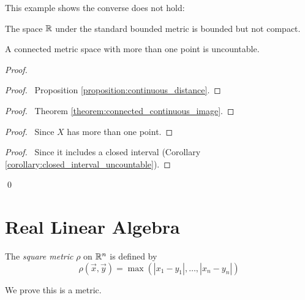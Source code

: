 This example shows the converse does not hold:

\begin{example}
    The space $\mathbb{R}$ under the standard bounded metric is bounded but not compact.
\end{example}

\begin{proposition}
    A connected metric space with more than one point is uncountable.
\end{proposition}

\begin{proof}
    \pf
    \begin{proof}
        \pf\ Proposition \ref{proposition:continuous_distance}.
    \end{proof}
    \begin{proof}
        \pf\ Theorem \ref{theorem:connected_continuous_image}.
    \end{proof}
    \begin{proof}
        \pf\ Since $X$ has more than one point.
    \end{proof}
    \begin{proof}
        \pf\ Since it includes a closed interval (Corollary \ref{corollary:closed_interval_uncountable}).
    \end{proof}
    \qed
\end{proof}

\section{Real Linear Algebra}

\begin{definition}
    The \emph{square metric} $\rho$ on $\mathbb{R}^n$ is defined by
    \[ \rho(\vec{x}, \vec{y}) = \max(|x_1 - y_1|, \ldots, |x_n - y_n|) \]
\end{definition}

We prove this is a metric.

